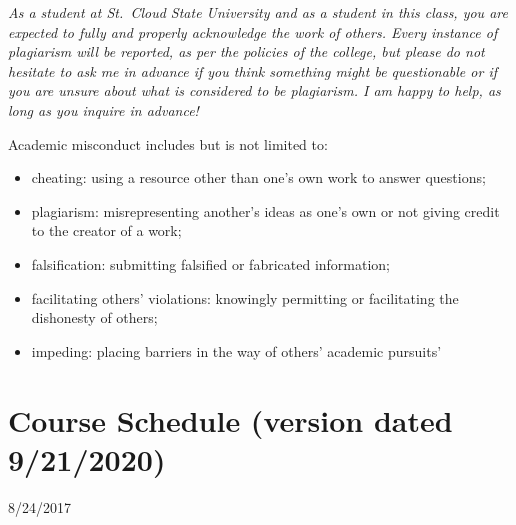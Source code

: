\documentclass{tufte-handout}
\begin{document}
\begin{fullwidth}

\emph{As a student at St.~Cloud State University and as a student in this class, you are expected to fully and properly acknowledge the work of others. Every instance of plagiarism will be reported, as per the policies of the college, but please do not hesitate to ask me in advance if you think something might be questionable or if you are unsure about what is considered to be plagiarism. I am happy to help, as long as you inquire in advance! }

Academic misconduct includes but is not limited to:

\begin{itemize}
	\item cheating: using a resource other than one's own work to answer questions;
	\item plagiarism: misrepresenting another's ideas as one's own or not giving credit to the creator of a work;
	\item falsification: submitting falsified or fabricated information;
	\item facilitating others' violations: knowingly permitting or facilitating the dishonesty of others;
	\item impeding: placing barriers in the way of others' academic pursuits'
\end{itemize}



\newpage 

\section{Course Schedule (version dated 9/21/2020)}



  \setlength{\calwidth}{6.5in}
  \setlength{\calboxdepth}{0.3in}
  \begin{calendar}{8/24/20}{17}

  \calday[Monday]{\classday} %
  \calday[Tuesday]{\classday} %
  \skipday\skipday\skipday     
  \skipday\skipday %







\end{calendar}
\end{fullwidth}
\end{document}
